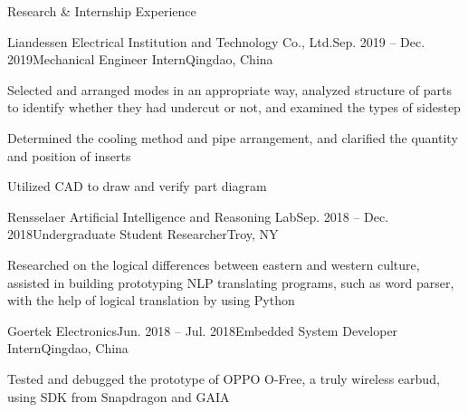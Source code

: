 \documentclass{resume} %
\begin{document}
\begin{rSection}{Research \& Internship Experience}

\begin{rSubsection}{Liandessen Electrical Institution and Technology Co., Ltd.}{Sep. 2019 – Dec. 2019}{Mechanical Engineer Intern}{Qingdao, China}
\item Selected and arranged modes in an appropriate way, analyzed structure of parts to identify whether they had undercut or not, and examined the types of sidestep
\item Determined the cooling method and pipe arrangement, and clarified the quantity and position of inserts
\item Utilized CAD to draw and verify part diagram
\end{rSubsection}


\begin{rSubsection}{Rensselaer Artificial Intelligence and Reasoning Lab}{Sep. 2018 – Dec. 2018}{Undergraduate Student Researcher}{Troy, NY}
\item Researched on the logical differences between eastern and western culture, assisted in building prototyping NLP translating programs, such as word parser, with the help of logical translation by using Python
\end{rSubsection}


\begin{rSubsection}{Goertek Electronics}{Jun. 2018 – Jul. 2018}{Embedded System Developer Intern}{Qingdao, China}
\item Tested and debugged the prototype of OPPO O-Free, a truly wireless earbud, using SDK from Snapdragon and GAIA
\end{rSubsection}

\end{rSection}

\end{document}
